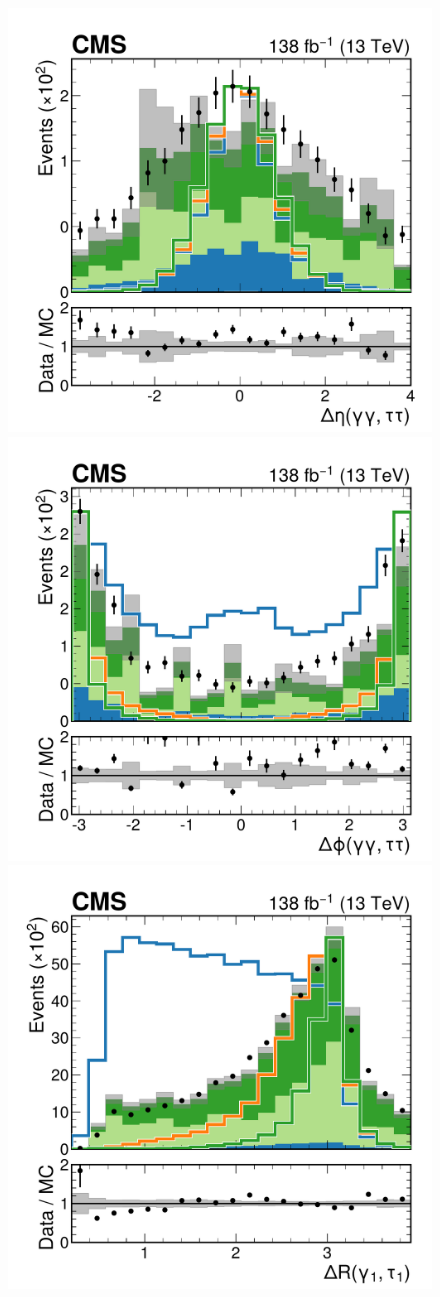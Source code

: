 \begin{figure}
    \centering
    \includegraphics[width=.49\linewidth]{Figures/Dihiggs/categorisation/input_features/Graviton/Scale_equal/Diphoton_ditau_deta_GluGluToBulkGravitonToHHTo2G2Tau_M-1000_linear.pdf}
    \includegraphics[width=.49\linewidth]{Figures/Dihiggs/categorisation/input_features/Graviton/Scale_equal/Diphoton_ditau_dphi_GluGluToBulkGravitonToHHTo2G2Tau_M-1000_linear.pdf} \\
    \includegraphics[width=.49\linewidth]{Figures/Dihiggs/categorisation/input_features/Graviton/Scale_equal/LeadPhoton_lead_lepton_dR_GluGluToBulkGravitonToHHTo2G2Tau_M-1000_linear.pdf}

\end{figure}
